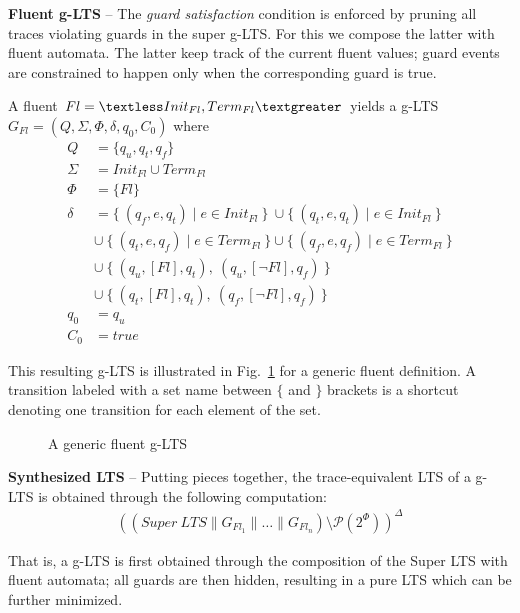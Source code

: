 \noindent \textbf{Fluent g-LTS} -- The \emph{guard satisfaction} condition is enforced by pruning all traces violating guards in the super g-LTS. For this we compose the latter with fluent automata. The latter keep track of the current fluent values; guard events are constrained to happen only when the corresponding guard is true.

A fluent $Fl = \textless Init_{Fl}, Term_{Fl} \textgreater $ yields a g-LTS $G_{Fl} = (Q,\Sigma,\Phi,\delta,q_{0},C_{0})$ where
\begin{align*}
Q      &= \{q_u,q_t,q_f\}            \\
\Sigma &= Init_{Fl} \cup Term_{Fl}   \\
\Phi   &= \{ Fl \} \\
\delta &=    \{~(q_f,e,q_t) \mid e \in Init_{Fl}~\}~\cup \{~(q_t,e,q_t) \mid e \in Init_{Fl}~\} \\
       &\cup~\{~(q_t,e,q_f) \mid e \in Term_{Fl}~\} \cup \{~(q_f,e,q_f) \mid e \in Term_{Fl}~\} \\
       &\cup~\{~(q_u, [Fl], q_t),~(q_u, [\neg Fl], q_f)~\} \\
       &\cup~\{~(q_t, [Fl], q_t),~(q_f, [\neg Fl], q_f)~\} \\
q_0    &= q_u \\
C_0    &= true
\end{align*}

This resulting g-LTS is illustrated in Fig.~\ref{image:fluent-glts} for a generic fluent definition. A transition labeled with a set name between $\{$ and $\}$ brackets is a shortcut denoting one transition for each element of the set.

\begin{figure}[H]\centering
{}
\caption{A generic fluent g-LTS\label{image:fluent-glts}}
\end{figure}

\noindent \textbf{Synthesized LTS} -- Putting pieces together, the trace-equivalent LTS of a g-LTS is obtained through the following computation:
\begin{align*}
\left((Super~LTS \parallel G_{Fl_1} \parallel \ldots \parallel G_{Fl_n}) \setminus \mathcal{P}(2^\Phi)\right)^\Delta
\end{align*}

That is, a g-LTS is first obtained through the composition of the Super LTS with fluent automata; all guards are then hidden, resulting in a pure LTS which can be further minimized.
